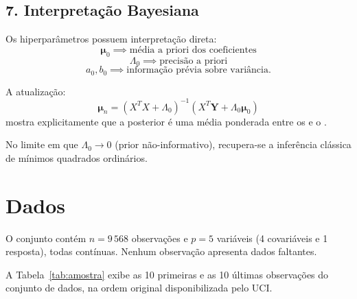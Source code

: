\documentclass[12pt, a4paper]{article}
\begin{document}


\subsection*{7. Interpretação Bayesiana}

Os hiperparâmetros possuem interpretação direta:
\[ \boldsymbol{\mu}_0 \implies \text{média a priori dos coeficientes} \]
\[ \Lambda_0 \implies \text{precisão a priori} \]
\[ a_0, b_0 \implies \text{informação prévia sobre variância}. \]

A atualização:
\[ \boldsymbol{\mu}_n = (X^TX+\Lambda_0)^{-1} (X^T\mathbf{Y}+\Lambda_0\boldsymbol{\mu}_0) \]
mostra explicitamente que a posterior é uma média ponderada entre os  e o .

No limite em que $\Lambda_0 \to 0$ (prior não-informativo), recupera-se a inferência clássica de mínimos quadrados ordinários.

\section*{Dados}

O conjunto contém $n = 9\,568$ observações e $p = 5$ variáveis (4 covariáveis
e 1 resposta), todas contínuas. Nenhum observação apresenta dados faltantes. 
 
A Tabela~\ref{tab:amostra} exibe as 10 primeiras e as 10 últimas observações do
conjunto de dados, na ordem original disponibilizada pelo UCI.
 
\end{document}
